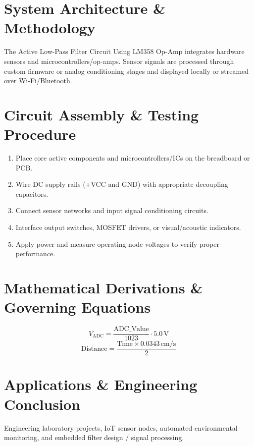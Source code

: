 \documentclass[11pt,a4paper]{article}
\begin{document}
\section{System Architecture \& Methodology}
The Active Low-Pass Filter Circuit Using LM358 Op-Amp integrates hardware sensors and microcontrollers/op-amps. Sensor signals are processed through custom firmware or analog conditioning stages and displayed locally or streamed over Wi-Fi/Bluetooth.

\section{Circuit Assembly \& Testing Procedure}
\begin{enumerate}
    \item Place core active components and microcontrollers/ICs on the breadboard or PCB.
    \item Wire DC supply rails (+VCC and GND) with appropriate decoupling capacitors.
    \item Connect sensor networks and input signal conditioning circuits.
    \item Interface output switches, MOSFET drivers, or visual/acoustic indicators.
    \item Apply power and measure operating node voltages to verify proper performance.
\end{enumerate}

\section{Mathematical Derivations \& Governing Equations}
\begin{equation}
V_{\text{ADC}} = \frac{\text{ADC\_Value}}{1023} \cdot 5.0\,\text{V}
\end{equation}
\begin{equation}
\text{Distance} = \frac{\text{Time} \times 0.0343\,\text{cm/s}}{2}
\end{equation}

\section{Applications \& Engineering Conclusion}
Engineering laboratory projects, IoT sensor nodes, automated environmental monitoring, and embedded filter design / signal processing.
\end{document}
